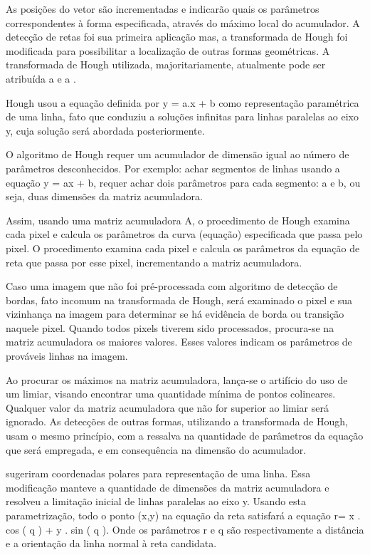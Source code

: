 As posições do vetor são incrementadas e indicarão quais os parâmetros correspondentes à forma especificada, através do máximo local do acumulador. A detecção de retas foi sua primeira aplicação mas, a transformada de Hough foi modificada para possibilitar a localização de outras formas geométricas. A transformada de Hough utilizada, majoritariamente, atualmente pode ser atribuída a  e a .

Hough usou a equação definida por y = a.x + b como representação paramétrica de uma linha, fato que conduziu a soluções infinitas para linhas paralelas ao eixo y, cuja solução será abordada posteriormente.
 
O algoritmo de Hough requer um acumulador de dimensão igual ao número de parâmetros desconhecidos. Por exemplo: achar segmentos de linhas usando a equação y = ax + b, requer achar dois parâmetros para cada segmento: a e b, ou seja, duas dimensões da matriz acumuladora.

Assim, usando uma matriz acumuladora A, o procedimento de Hough examina cada pixel e calcula os parâmetros da curva (equação) especificada que passa pelo pixel. 
O procedimento examina cada pixel e calcula os parâmetros da equação de reta que passa por esse pixel, incrementando a matriz acumuladora.

Caso uma imagem que não foi pré-processada com algoritmo de detecção de bordas, fato incomum na transformada de Hough, será examinado o pixel e sua vizinhança na imagem para determinar se há evidência de borda ou transição naquele pixel. Quando todos pixels tiverem sido processados, procura-se na matriz acumuladora os maiores valores. Esses valores indicam os parâmetros de prováveis linhas na imagem.

Ao procurar os máximos na matriz acumuladora, lança-se o artifício do uso de um limiar, visando encontrar uma quantidade mínima de pontos colineares. Qualquer valor da matriz acumuladora que não for superior ao limiar será ignorado. As detecções de outras formas, utilizando a transformada de Hough, usam o mesmo princípio, com a ressalva na quantidade de parâmetros da equação que será empregada, e em consequência na dimensão do acumulador.
 
 sugeriram coordenadas polares para representação de uma linha. Essa modificação manteve a quantidade de dimensões da matriz acumuladora e resolveu a limitação inicial de linhas paralelas ao eixo y. Usando esta parametrização, todo o ponto (x,y) na equação da reta satisfará a equação r= x . cos ( q ) + y . sin ( q ). Onde os parâmetros r e q são respectivamente a distância e a orientação da linha normal à reta candidata.

